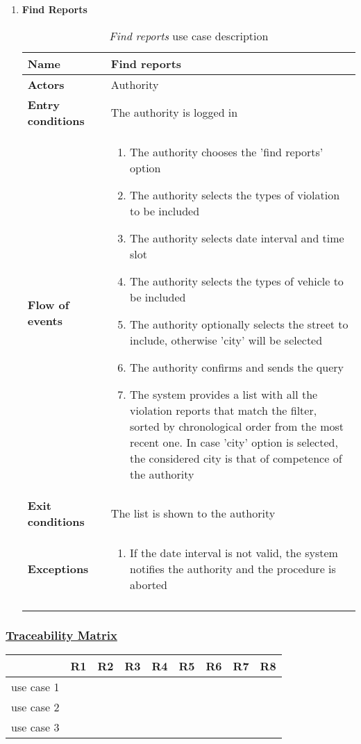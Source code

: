 \begin{enumerate}
		\item \textbf{Find Reports}
			\begin{longtable}{p{0.25\linewidth}p{0.75\linewidth}}
				\toprule
				\textbf{Name} & \textbf{Find reports} \\
				\midrule
				\textbf{Actors} & Authority\\
				\midrule
				\textbf{Entry conditions} & The authority is logged in \\
				\midrule
				\textbf{Flow of events} & 
				\begin{enumerate}
					\item The authority chooses the 'find reports' option
					\item The authority selects the types of violation to be included
					\item The authority selects date interval and time slot
					\item The authority selects the types of vehicle to be included
					\item The authority optionally selects the street to include, otherwise 'city' will be selected
					\item The authority confirms and sends the query
					\item The system provides a list with all the violation reports that match the filter, sorted by chronological order from the most recent one. In case 'city' option is selected, the considered city is that of competence of the authority
				\end{enumerate} \\
				\midrule
				\textbf{Exit conditions} & The list is shown to the authority\\
				\midrule
				\textbf{Exceptions} &  
				\begin{enumerate}
					\item If the date interval is not valid, the system notifies the authority and the procedure is aborted
				\end{enumerate}\\
				\bottomrule
				\caption{\emph{Find reports} use case description}
			\end{longtable}
	\end{enumerate}

\subsubsection[Traceability Matrix]{\hyperlink{toc}{Traceability Matrix}} %
	\begin{tabular}{|c|c|c|c|c|c|c|c|c|}
		\cline{2-9}
		\multicolumn{1}{c|}{} & R1 & R2 & R3 & R4 & R5 & R6 & R7 & R8 \\
		\hline
		use case 1 & \xmark & & & & & & &\\
		\hline
		use case 2 & & & & \xmark & & & &\\
		\hline
		use case 3 & \xmark & \xmark & \xmark & & & & \xmark &\\
		\hline
	\end{tabular}
	
